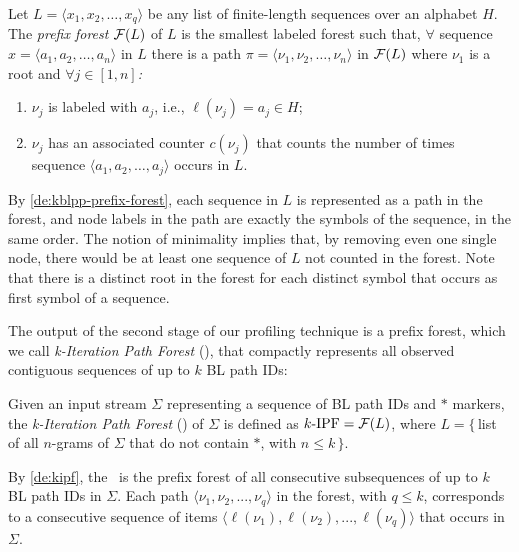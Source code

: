 \begin{definition}
\label{de:kblpp-prefix-forest}
Let $L=\langle x_1, x_2, \ldots, x_q\rangle$ be any list of finite-length sequences over an alphabet $H$. The {\em prefix forest} ${\cal F}(L)$ of $L$ is the smallest labeled forest such that, $\forall$ sequence $x=\langle a_1, a_2, \ldots, a_n\rangle$ in $L$ there is a path $\pi=\langle \nu_1, \nu_2, \ldots, \nu_n\rangle$ in ${\cal F}(L)$ where $\nu_1$ is a root and $\forall j\in[1,n]${\em :}
\begin{enumerate}
\item $\nu_j$ is labeled with $a_j$, i.e., $\ell(\nu_j)=a_j\in H$;
\item $\nu_j$ has an associated counter $c(\nu_j)$ that counts the number of times sequence $\langle a_1, a_2, \ldots, a_j\rangle$ occurs in $L$.
\end{enumerate}
\end{definition}

\noindent By \mydefinition\ref{de:kblpp-prefix-forest}, each sequence in $L$ is represented as a path in the forest, and node labels in the path are exactly the symbols of the sequence, in the same order. The notion of minimality implies that, by removing even one single node, there would be at least one sequence of $L$ not counted in the forest. Note that there is a distinct root in the forest for each distinct symbol that occurs as first symbol of a sequence.

The output of the second stage of our profiling technique is a prefix forest, which we call {\em k-Iteration Path Forest} (\kipf), that compactly represents all observed contiguous sequences of up to $k$ BL path IDs:

\begin{definition}
\label{de:kipf}
Given an input stream $\Sigma$ representing a sequence of BL path IDs and $*$ markers, the {\em k-Iteration Path Forest} (\kipf) of $\Sigma$ is defined as $\mbox{$k$-IPF}={\cal F}(L)$, where $L=\{$\,list of all $n$-grams of $\Sigma$ that do not contain $*$, with $n\le k\,\}$.
\end{definition}

\noindent By \mydefinition\ref{de:kipf}, the \kipf\ is the prefix forest of all consecutive subsequences of up to $k$ BL path IDs in $\Sigma$. Each path $\langle\nu_1, \nu_2, ..., \nu_q\rangle$ in the forest, with $q\le k$, corresponds to a consecutive sequence of items $\langle\ell(\nu_1), \ell(\nu_2), ..., \ell(\nu_q)\rangle$ that occurs in $\Sigma$.

